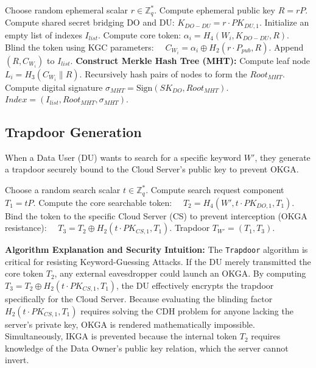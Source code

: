 \documentclass[10pt,journal,compsoc]{IEEEtran}
\begin{document}
\begin{algorithm}[H]
\caption{EncryptIndex($\mathcal{W}$, $PK_{DU}$, $SK_{DO}$)}
\begin{algorithmic}[1]
\State Choose random ephemeral scalar $r \in \mathbb{Z}_q^*$.
\State Compute ephemeral public key $R = rP$.
\State Compute shared secret bridging DO and DU: $K_{DO-DU} = r \cdot PK_{DU,1}$.
\State Initialize an empty list of indexes $I_{list}$.
    \State Compute core token: $\alpha_i = H_4(W_i, K_{DO-DU}, R)$.
    \State Blind the token using KGC parameters: 
    \Statex $\quad C_{W_i} = \alpha_i \oplus H_2(r \cdot P_{pub}, R)$.
    \State Append $(R, C_{W_i})$ to $I_{list}$.
\EndFor
\State \textbf{Construct Merkle Hash Tree (MHT):}
    \State Compute leaf node $L_i = H_3(C_{W_i} \parallel R)$.
\EndFor
\State Recursively hash pairs of nodes to form the $Root_{MHT}$.
\State Compute digital signature $\sigma_{MHT} = \text{Sign}(SK_{DO}, Root_{MHT})$.
\State \Return $Index = (I_{list}, Root_{MHT}, \sigma_{MHT})$.
\end{algorithmic}
\end{algorithm}

\subsection{Trapdoor Generation}
When a Data User (DU) wants to search for a specific keyword $W'$, they generate a trapdoor securely bound to the Cloud Server's public key to prevent OKGA.

\begin{algorithm}[H]
\caption{Trapdoor($W'$, $PK_{DO}$, $PK_{CS}$, $SK_{DU}$)}
\begin{algorithmic}[1]
\State Choose a random search scalar $t \in \mathbb{Z}_q^*$.
\State Compute search request component $T_1 = tP$.
\State Compute the core searchable token: 
\Statex $\quad T_2 = H_4(W', t \cdot PK_{DO,1}, T_1)$.
\State Bind the token to the specific Cloud Server (CS) to prevent interception (OKGA resistance):
\Statex $\quad T_3 = T_2 \oplus H_2(t \cdot PK_{CS,1}, T_1)$.
\State \Return Trapdoor $T_{W'} = (T_1, T_3)$.
\end{algorithmic}
\end{algorithm}

\textbf{Algorithm Explanation and Security Intuition:} The \texttt{Trapdoor} algorithm is critical for resisting Keyword-Guessing Attacks. If the DU merely transmitted the core token $T_2$, any external eavesdropper could launch an OKGA. By computing $T_3 = T_2 \oplus H_2(t \cdot PK_{CS,1}, T_1)$, the DU effectively encrypts the trapdoor specifically for the Cloud Server. Because evaluating the blinding factor $H_2(t \cdot PK_{CS,1}, T_1)$ requires solving the CDH problem for anyone lacking the server's private key, OKGA is rendered mathematically impossible. Simultaneously, IKGA is prevented because the internal token $T_2$ requires knowledge of the Data Owner's public key relation, which the server cannot invert.
\end{document}
